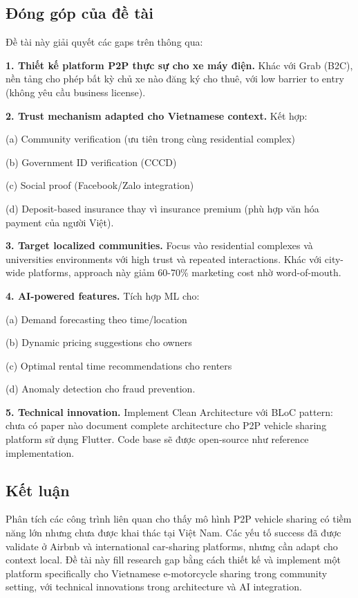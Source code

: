 \subsection{Đóng góp của đề tài}

Đề tài này giải quyết các gaps trên thông qua:

\textbf{1. Thiết kế platform P2P thực sự cho xe máy điện.} Khác với Grab (B2C), nền tảng cho phép bất kỳ chủ xe nào đăng ký cho thuê, với low barrier to entry (không yêu cầu business license).

\textbf{2. Trust mechanism adapted cho Vietnamese context.} Kết hợp: 

(a) Community verification (ưu tiên trong cùng residential complex)

(b) Government ID verification (CCCD) 

(c) Social proof (Facebook/Zalo integration)

(d) Deposit-based insurance thay vì insurance premium (phù hợp văn hóa payment của người Việt).

\textbf{3. Target localized communities.} Focus vào residential complexes và universities environments với high trust và repeated interactions. Khác với city-wide platforms, approach này giảm 60-70\% marketing cost nhờ word-of-mouth.

\textbf{4. AI-powered features.} Tích hợp ML cho: 

(a) Demand forecasting theo time/location

(b) Dynamic pricing suggestions cho owners 

(c) Optimal rental time recommendations cho renters

(d) Anomaly detection cho fraud prevention.

\textbf{5. Technical innovation.} Implement Clean Architecture với BLoC pattern: chưa có paper nào document complete architecture cho P2P vehicle sharing platform sử dụng Flutter. 
Code base sẽ được open-source như reference implementation.

\subsection{Kết luận}

Phân tích các công trình liên quan cho thấy mô hình P2P vehicle sharing có tiềm năng lớn nhưng chưa được khai thác tại Việt Nam. Các yếu tố success đã được validate ở Airbnb và international car-sharing platforms, nhưng cần adapt cho context local. Đề tài này fill research gap bằng cách thiết kế và implement một platform specifically cho Vietnamese e-motorcycle sharing trong community setting, với technical innovations trong architecture và AI integration.